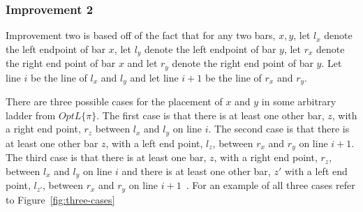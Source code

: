 \subsubsection{Improvement 2}
Improvement two is based off of the fact that for any two bars,
$x,y$, let $l_{x}$ denote the left endpoint of bar $x$, let 
$l_{y}$ denote the left endpoint of bar $y$, let $r_{x}$ denote 
the right end point of bar $x$ and let $r_{y}$ denote the right 
end point of bar $y$. Let line $i$ be the line of $l_{x}$ and $l_{y}$
and let line $i+1$ be the line of $r_{x}$ and $r_{y}$.
\begin{lemma}
There are three possible cases for the placement of $x$ and $y$ in some arbitrary ladder from $OptL\{\pi\}$. 
The first case is that there 
is at least one other bar, $z$, with a right end point, $r_{z}$ between $l_{x}$
and $l_{y}$ on line $i$. The second case is that there is at least one other bar 
$z$, with a left end point, $l_{z}$, between $r_{x}$ and $r_{y}$ on line $i+1$. 
The third case is that there is at least one bar, $z$, with a right end point, 
$r_{z}$, between $l_{x}$ and $l_{y}$ on line $i$ and there is at least one other bar, 
$z\prime$ with a left end point, $l_{z\prime}$, between $r_{x}$ and $r_{y}$ on line $i+1$~\cite{A5}. 
For an example of all three cases refer to Figure~\ref{fig:three-cases}\par
\end{lemma}
